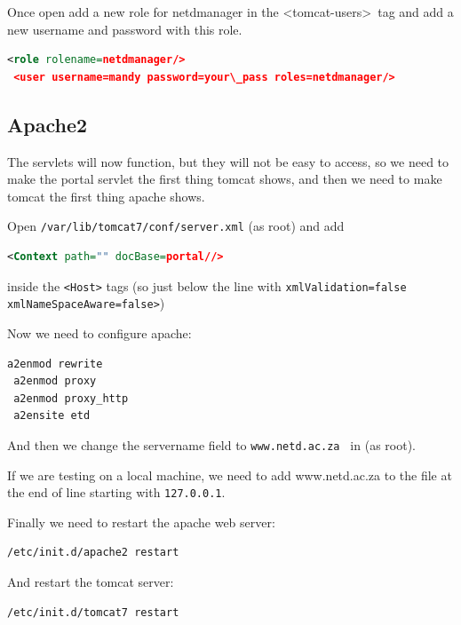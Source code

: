 \documentclass[a4paper,11pt]{article}
\begin{document}
Once open add a new role for netdmanager in the \textless tomcat-users\textgreater \, tag and add a new username and password with this role. 

\begin{lstlisting}[language=XML]
 <role rolename=netdmanager/> 
 <user username=mandy password=your\_pass roles=netdmanager/>
\end{lstlisting}

\subsection{Apache2}

The servlets will now function, but they will not be easy to access, so we need to make the portal servlet the first thing tomcat shows, and then we need to make tomcat the first thing apache shows.

Open \texttt{/var/lib/tomcat7/conf/server.xml} (as root) and add 

\begin{lstlisting}[language=XML]
 <Context path="" docBase=portal//> 
\end{lstlisting}

inside the \texttt{<Host>} tags (so just below the line with \texttt{xmlValidation=false xmlNameSpaceAware=false>})

Now we need to configure apache: 

\begin{lstlisting}[language=bash]
 a2enmod rewrite 
 a2enmod proxy 
 a2enmod proxy_http 
 a2ensite etd
\end{lstlisting}

And then we change the servername field to \texttt{www.netd.ac.za } in  (as root).

If we are testing on a local machine, we need to add www.netd.ac.za to the  file at the end of line starting with \texttt{127.0.0.1}.

Finally we need to restart the apache web server: 

\begin{lstlisting}[language=bash]
 /etc/init.d/apache2 restart
\end{lstlisting}

And restart the tomcat server: 

\begin{lstlisting}[language=bash]
 /etc/init.d/tomcat7 restart
\end{lstlisting}
\end{document}
